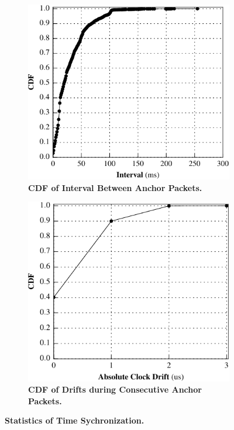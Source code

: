 \begin{figure}[t!]
  \centering
  \begin{subfigure}{0.48\textwidth}
    \includegraphics[width=\textwidth]{./figures/AnchorInterval.pdf}
    \caption{\textbf{CDF of Interval Between Anchor Packets.}}
    \label{fig:anchor_interval}
  \end{subfigure}
  \begin{subfigure}{0.48\textwidth}
    \includegraphics[width=\textwidth]{./figures/DriftRate.pdf}
    \caption{\textbf{CDF of Drifts during Consecutive Anchor Packets.}}
    \label{fig:anchor_drift}
  \end{subfigure}
  \caption{\textbf{Statistics of Time Sychronization.}}
\end{figure}

